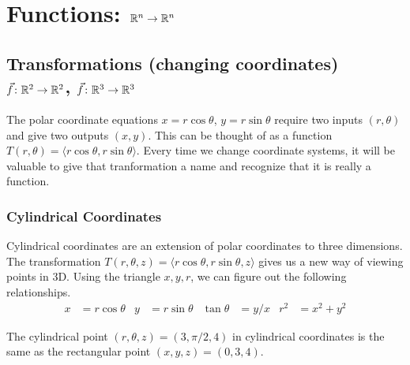 \section{Functions: $\mathbb{R}^n\to \mathbb{R}^n$}

\subsection{Transformations (changing coordinates)\\ {$\vec f\colon \mathbb{R}^2\to \mathbb{R}^2$}, {$\vec f\colon \mathbb{R}^3\to \mathbb{R}^3$}}

The polar coordinate equations $x=r\cos\theta$, $y=r\sin\theta$
require two inputs $(r,\theta)$ and give two outputs $(x,y)$.  This can
be thought of as a function $T(r,\theta)=\langle
r\cos\theta,r\sin\theta\rangle$. Every time we change coordinate
systems, it will be valuable to give that tranformation a name and
recognize that it is really a function.


\subsubsection{Cylindrical Coordinates}
Cylindrical coordinates are an extension of polar coordinates to three
dimensions.  The transformation $T(r,\theta,z) = \langle
r\cos\theta,r\sin\theta,z\rangle$ gives us a new way of viewing points
in 3D.  Using the triangle $x,y,r$, we can figure out the following
relationships.
\begin{align*}
  x&=r \cos \theta & 
  y&=r \sin \theta & 
  \tan\theta&=y/x & 
  r^2&=x^2+y^2     
\end{align*}

\begin{example}
The cylindrical point {$(r, \theta, z)=(3,\pi/2,4)$} in
cylindrical coordinates is the same as the rectangular point $(x,y,z)
= (0,3,4)$.
\end{example}

